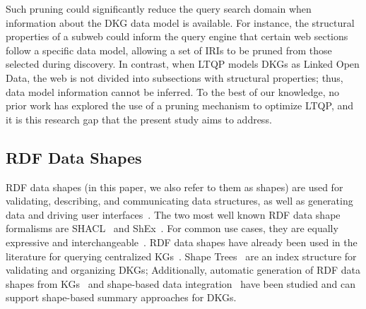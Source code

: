 Such pruning could significantly reduce the query search domain when information about the \ac{DKG} data model is available.
For instance, the structural properties of a subweb could inform the query engine that certain web sections follow a specific data model, allowing a set of \acp{IRI} to be pruned from those selected during discovery.
In contrast, when \ac{LTQP} models \acp{DKG} as Linked Open Data, the web is not divided into subsections with structural properties; thus, data model information cannot be inferred.
To the best of our knowledge, no prior work has explored the use of a pruning mechanism to optimize \ac{LTQP}, and it is this research gap that the present study aims to address.

\subsection{RDF Data Shapes}
\ac{RDF} data shapes (in this paper, we also refer to them as shapes) are used for validating, describing, and communicating data structures, as well as generating data and driving user interfaces~\cite{Gayo2018a,Gayo2018}.
The two most well known \ac{RDF} data shape formalisms are \ac{SHACL}~\cite{Gayo2018b} and \ac{ShEx}~\cite{Gayo2018}.
For common use cases, they are equally expressive and interchangeable~\cite{Gayo2018c}.
\ac{RDF} data shapes have already been used in the literature for querying centralized \acp{KG}~\cite{kashif2021, delva2023}.
Shape Trees~\cite{shapetreesShapeTrees} are an index structure for validating and organizing \acp{DKG}; 
Additionally, automatic generation of \ac{RDF} data shapes from \acp{KG}~\cite{fernandez2023extracting} and shape-based data integration~\cite{LabraGayo2023} have been studied and can support shape-based summary approaches for \acp{DKG}.


